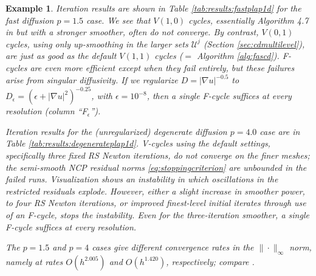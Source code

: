 \documentclass[letterpaper,final,12pt,reqno]{amsart}
\theoremstyle{cstyle}
\theoremstyle{cstyle*}
\theoremstyle{dstyle}
\newtheorem{example}[theorem]{Example}
\numberwithin{equation}{section}
\numberwithin{figure}{section}
\numberwithin{table}{section}
\numberwithin{theorem}{section}
\newcommand{\eps}{\epsilon}
\newcommand{\grad}{\nabla}
\begin{document}
\begin{example}
Iteration results are shown in Table \ref{tab:results:fastplap1d} for the fast diffusion $p=1.5$ case.  We see that $V(1,0)$ cycles, essentially Algorithm 4.7 in \cite{GraeserKornhuber2009} but with a stronger smoother, often do not converge.  By contrast, $V(0,1)$ cycles, using only up-smoothing in the larger sets $\mathcal{U}^j$ (Section \ref{sec:cdmultilevel}), are just as good as the default $V(1,1)$ cycles ($=$ Algorithm \ref{alg:fascd}).  F-cycles are even more efficient except when they fail entirely, but these failures arise from singular diffusivity.  If we regularize  $D=|\grad u|^{-0.5}$ to $D_\eps = \left(\eps + |\grad u|^2\right)^{-0.25}$, with $\eps=10^{-8}$, then a single F-cycle suffices at every resolution (column ``F$_\eps$'').

Iteration results for the (unregularized) degenerate diffusion $p=4.0$ case are in Table \ref{tab:results:degenerateplap1d}.  V-cycles using the default settings, specifically three fixed RS Newton iterations, do not converge on the finer meshes; the semi-smooth NCP residual norms \eqref{eq:stoppingcriterion} are unbounded in the failed runs.  Visualization shows an instability in which oscillations in the restricted residuals explode.  However, either a slight increase in smoother power, to four RS Newton iterations, or improved finest-level initial iterates through use of an F-cycle, stops the instability.  Even for the three-iteration smoother, a single F-cycle suffices at every resolution.

The $p=1.5$ and $p=4$ cases give different convergence rates in the $\|\cdot\|_\infty$ norm, namely at rates $O(h^{2.005})$ and $O(h^{1.420})$, respectively; compare \cite{ChoeLewis1991}.
\end{example}
\end{document}
